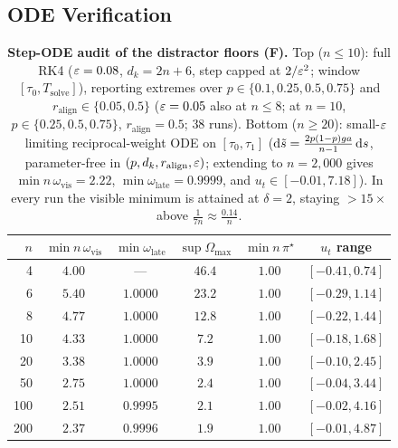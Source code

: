\subsection{ODE Verification}
\label{app:proof-checks}
\label{app:verify}
\label{app:J-check}
\label{app:J-generalK}
\label{tab:verify}

\begin{table}[!htbp]
\caption{\textbf{Step-ODE audit of the distractor floors (F).} Top ($n \le 10$): full \stepode{} RK4 ($\varepsilon = 0.08$, $d_k = 2n+6$, step capped at $2/\varepsilon^2$; window $[\tau_0, T_{\mathrm{solve}}]$), reporting extremes over $p \in \{0.1, 0.25, 0.5, 0.75\}$ and $r_{\mathrm{align}} \in \{0.05, 0.5\}$ ($\varepsilon = 0.05$ also at $n \le 8$; at $n = 10$, $p \in \{0.25, 0.5, 0.75\}$, $r_{\mathrm{align}} = 0.5$; $38$ runs). Bottom ($n \ge 20$): small-$\varepsilon$ limiting reciprocal-weight ODE on $[\tau_0, \tau_1]$ ($\mathrm{d}\tilde s = \frac{2p(1-p)ga}{n-1}\,\mathrm{d} s$, parameter-free in $(p, d_k, r_{\mathrm{align}}, \varepsilon)$; extending to $n = 2{,}000$ gives $\min n\,\omega_{\mathrm{vis}} = 2.22$, $\min\omega_{\mathrm{late}} = 0.9999$, and $u_t \in [-0.01, 7.18]$). In every run the visible minimum is attained at $\delta = 2$, staying $> 15\times$ above $\frac{1}{7n} \approx \frac{0.14}{n}$.}
\label{tab:U-floor-audit}
\centering\footnotesize
\begin{tabular}{@{}rccccc@{}}
\toprule
$n$ & $\min n\,\omega_{\mathrm{vis}}$ & $\min\omega_{\mathrm{late}}$ & $\sup\Omega_{\max}$ & $\min n\,\pi^\star$ & $u_t$ range\\
\midrule
4   & $4.00$ & ---      & $46.4$ & $1.00$ & $[-0.41, 0.74]$\\
6   & $5.40$ & $1.0000$ & $23.2$ & $1.00$ & $[-0.29, 1.14]$\\
8   & $4.77$ & $1.0000$ & $12.8$ & $1.00$ & $[-0.22, 1.44]$\\
10  & $4.33$ & $1.0000$ & $7.2$  & $1.00$ & $[-0.18, 1.68]$\\
\midrule
20  & $3.38$ & $1.0000$ & $3.9$  & $1.00$ & $[-0.10, 2.45]$\\
50  & $2.75$ & $1.0000$ & $2.4$  & $1.00$ & $[-0.04, 3.44]$\\
100 & $2.51$ & $0.9995$ & $2.1$  & $1.00$ & $[-0.02, 4.16]$\\
200 & $2.37$ & $0.9996$ & $1.9$  & $1.00$ & $[-0.01, 4.87]$\\
\bottomrule
\end{tabular}
\end{table}


